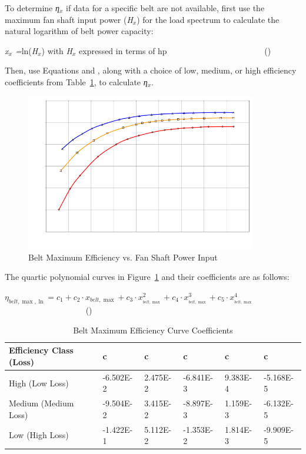 To determine \emph{η\(_{x}\)} if data for a specific belt are not available, first use the maximum fan shaft input power (\emph{H\(_{x}\)}) for the load spectrum to calculate the natural logarithm of belt power capacity:

\emph{x\(_{x}\) =}ln(\emph{H\(_{x}\)}) with \emph{H\(_{x}\)} expressed in terms of hp~~~~~~~~~~~~~~~~~~~~~~~ ()

Then, use Equations and , along with a choice of low, medium, or high efficiency coefficients from Table~\ref{table:belt-maximum-efficiency-curve-coefficients}, to calculate \emph{η\(_{x}\)}.

\begin{figure}[hbtp] %
\centering
\includegraphics[width=0.9\textwidth, height=0.9\textheight, keepaspectratio=true]{media/image4907.svg.png}
\caption{Belt Maximum Efficiency vs. Fan Shaft Power Input \protect \label{fig:belt-maximum-efficiency-vs.-fan-shaft-power}}
\end{figure}

The quartic polynomial curves in Figure~\ref{fig:belt-maximum-efficiency-vs.-fan-shaft-power} and their coefficients are as follows:

\({\eta_{belt,\max ,\ln }} = {c_1} + {c_2} \cdot {x_{belt,\max }} + {c_3} \cdot x_{_{belt,\max }}^2 + {c_4} \cdot x_{_{belt,\max }}^3 + {c_5} \cdot x_{_{belt,\max }}^4\) ~~~~~~~~~~~~~~~~~~~ ()

\begin{longtable}[c]{p{1.0in}p{1.0in}p{1.0in}p{1.0in}p{1.0in}p{1.0in}}
\caption{Belt Maximum Efficiency Curve Coefficients \protect \label{table:belt-maximum-efficiency-curve-coefficients}}\\
\toprule 
Efficiency Class (Loss) & c & c & c & c & c \tabularnewline \midrule
\endhead
High (Low Loss) & -6.502E-2 & 2.475E-2 & -6.841E-3 & 9.383E-4 & -5.168E-5 \tabularnewline
Medium (Medium Loss) & -9.504E-2 & 3.415E-2 & -8.897E-3 & 1.159E-3 & -6.132E-5 \tabularnewline
Low (High Loss) & -1.422E-1 & 5.112E-2 & -1.353E-2 & 1.814E-3 & -9.909E-5 \tabularnewline
\bottomrule
\end{longtable}


